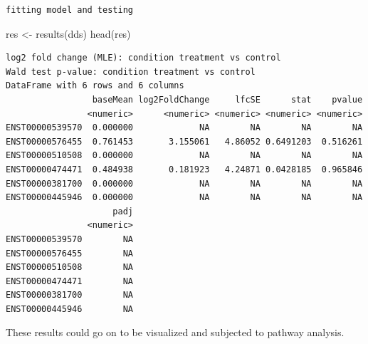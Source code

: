 \documentclass[
  letterpaper,
  DIV=11,
  numbers=noendperiod]{scrartcl}
\newenvironment{Shaded}{\begin{snugshade}}{\end{snugshade}}
\newcommand{\FunctionTok}[1]{\textcolor[rgb]{0.28,0.35,0.67}{#1}}
\newcommand{\NormalTok}[1]{\textcolor[rgb]{0.00,0.23,0.31}{#1}}
\newcommand{\OtherTok}[1]{\textcolor[rgb]{0.00,0.23,0.31}{#1}}
\begin{document}
\begin{verbatim}
fitting model and testing
\end{verbatim}

\begin{Shaded}
\begin{Highlighting}[]
\NormalTok{res }\OtherTok{\textless{}{-}} \FunctionTok{results}\NormalTok{(dds)}
\FunctionTok{head}\NormalTok{(res)}
\end{Highlighting}
\end{Shaded}

\begin{verbatim}
log2 fold change (MLE): condition treatment vs control 
Wald test p-value: condition treatment vs control 
DataFrame with 6 rows and 6 columns
                 baseMean log2FoldChange     lfcSE      stat    pvalue
                <numeric>      <numeric> <numeric> <numeric> <numeric>
ENST00000539570  0.000000             NA        NA        NA        NA
ENST00000576455  0.761453       3.155061   4.86052 0.6491203  0.516261
ENST00000510508  0.000000             NA        NA        NA        NA
ENST00000474471  0.484938       0.181923   4.24871 0.0428185  0.965846
ENST00000381700  0.000000             NA        NA        NA        NA
ENST00000445946  0.000000             NA        NA        NA        NA
                     padj
                <numeric>
ENST00000539570        NA
ENST00000576455        NA
ENST00000510508        NA
ENST00000474471        NA
ENST00000381700        NA
ENST00000445946        NA
\end{verbatim}

These results could go on to be visualized and subjected to pathway
analysis.
\end{document}

